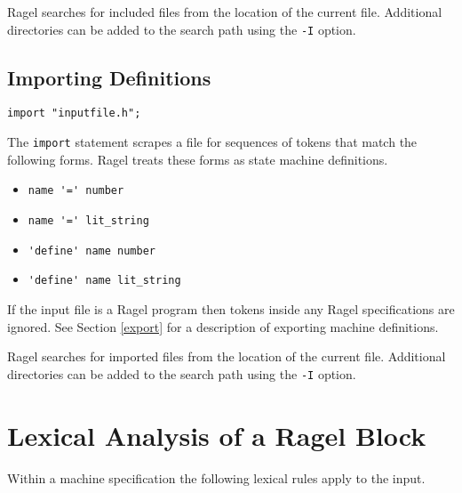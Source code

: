\documentclass[letterpaper,11pt,oneside]{book}
\newcommand{\verbspace}{\vspace{10pt}}
\begin{document}
Ragel searches for included files from the location of the current file.
Additional directories can be added to the search path using the \verb|-I|
option.

\subsection{Importing Definitions}
\label{import}

\begin{verbatim}
import "inputfile.h";
\end{verbatim}
\verbspace

The \verb|import| statement scrapes a file for sequences of tokens that match
the following forms. Ragel treats these forms as state machine definitions.

\begin{itemize}
    \setlength{\itemsep}{-2mm}
    \item \verb|name '=' number|
    \item \verb|name '=' lit_string|
    \item \verb|'define' name number|
    \item \verb|'define' name lit_string|
\end{itemize}

If the input file is a Ragel program then tokens inside any Ragel
specifications are ignored. See Section \ref{export} for a description of
exporting machine definitions.

Ragel searches for imported files from the location of the current file.
Additional directories can be added to the search path using the \verb|-I|
option.

\section{Lexical Analysis of a Ragel Block}
\label{lexing}

Within a machine specification the following lexical rules apply to the input.
\end{document}
